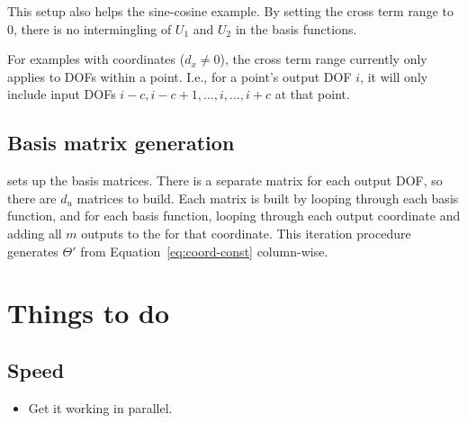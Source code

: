 \documentclass{article}
\def\lstinline#1{}%
\begin{document}
This setup also helps the sine-cosine example. By setting the cross term range
to 0, there is no intermingling of $U_1$ and $U_2$ in the basis functions.

For examples with coordinates ($d_x \ne 0$), the cross term range currently only
applies to DOFs within a point. I.e., for a point's output DOF $i$, it will only
include input DOFs $i-c,i-c+1,\hdots,i,\hdots,i+c$ at that point.

\subsection{Basis matrix generation}

\lstinline{SINDyBasisAddVariables} sets up the basis matrices. There is a
separate matrix for each output DOF, so there are $d_u$ matrices to build.
Each matrix is built by looping through each basis function, and for each basis function,
looping through each output coordinate and adding all $m$ outputs to the for that coordinate.
This iteration procedure generates $\Theta'$ from Equation~\ref{eq:coord-const} column-wise.


\section{Things to do}

\subsection{Speed}
\begin{itemize}
    \item Get it working in parallel.
\end{itemize}
\end{document}

